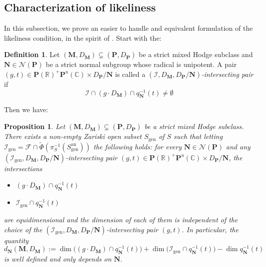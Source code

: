 \documentclass[10pt]{article}
\numberwithin{equation}{subsection}
\theoremstyle{plain}
\newtheorem{proposition}[theorem]{Proposition}
\theoremstyle{definition}
\newtheorem{definition}[theorem]{Definition}
\theoremstyle{remark}
\newcommand{\I}{\mathscr{I}}
\newcommand{\F}{\mathscr{F}}
\newcommand{\C}{\mathbb C}
\newcommand{\R}{\mathbb R}
\newcommand{\pp}{\mathbf P}
\newcommand{\M}{\mathbf M}
\newcommand{\NN}{\mathbf N}
\newcommand{\an}{\mathrm{an}}
\newcommand{\Np}{\mathcal{N}(\pp)}
\newcommand{\gen}{\mathrm{gen}}
\begin{document}
\subsection{Characterization of likeliness}
In this subsection, we prove an easier to handle and equivalent formulation of the likeliness condition, in the spirit of \cite{ku}. Start with the:
\begin{definition}
Let $(\M,D_\M) \subsetneq (\pp,D_\pp)$ be a strict mixed Hodge subclass and $\NN \in \Np$ be a strict normal subgroup whose radical is unipotent. A pair $(g,t) \in \pp(\R)^+\pp^u(\C) \times D_\pp/\NN$ is called a \textit{$(\I,D_\M,D_\pp/\NN)$-intersecting pair} if
\[
\I \cap (g \cdot D_\M) \cap q_\NN^{-1}(t) \neq \emptyset
\]
\end{definition}
Then we have:
\begin{proposition}\label{indep}
Let $(\M,D_\M) \subsetneq (\pp,D_\pp)$ be a strict mixed Hodge subclass. There exists a non-empty Zariski open subset $S_\gen$ of $S$ such that letting $\I_\gen = \F \cap \tilde{\Phi}(\pi_S^{-1}(S_\gen^\an))$ the following holds: for every $\NN\in \Np$ and any $(\I_\gen,D_\M,D_\pp/\NN)$-intersecting pair $(g,t)  \in \pp(\R)^+\pp^u(\C) \times D_\pp/\NN$, the intersections
\begin{itemize}
\item[(a)] $(g\cdot D_\M) \cap q_\NN^{-1}(t)$
\item[(b)] $\I_\gen \cap q_\NN^{-1}(t)$
\end{itemize}
are equidimensional and the dimension of each of them is independent of the choice of the $(\I_\gen,D_\M,D_\pp/\NN)$-intersecting pair $(g,t)$. In particular, the quantity
\[
d_\NN(\M,D_\M) := \dim\big((g\cdot D_\M) \cap q_\NN^{-1}(t)\big) + \dim\big(\I_\gen \cap q_\NN^{-1}(t)\big) - \dim q_\NN^{-1}(t)
\]
is well defined and only depends on $\NN$.
\end{proposition}
\end{document}
